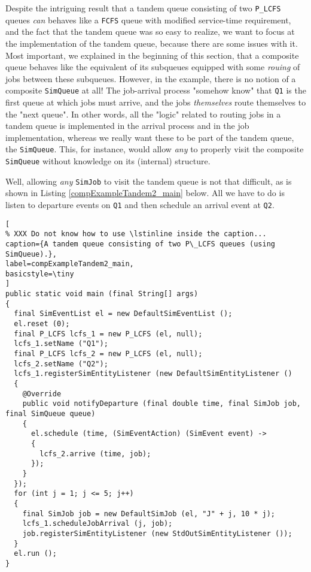 Despite the intriguing result that a tandem queue consisting of two
  \lstinline|P_LCFS| queues {\em can\/} behaves like a \lstinline|FCFS|
  queue with modified service-time requirement,
  and the fact that the tandem queue was so easy to realize,
  we want to focus at the implementation of the tandem queue,
  because there are some issues with it.
Most important,
  we explained in the beginning of this section,
  that a composite queue behaves like the equivalent
  of its subqueues equipped with some
  {\em rouing\/} of jobs between these subqueues.
However, in the example, there is no notion of a composite
  \lstinline|SimQueue| at all!
The job-arrival process "somehow know" that \lstinline|Q1|
  is the first queue at which jobs must arrive,
  and the jobs {\em themselves\/} route themselves
  to the "next queue".
In other words, all the "logic" related to routing jobs in a
  tandem queue is implemented in the arrival process and
  in the job implementation,
  whereas we really want these to be part of the tandem queue,
  the \lstinline|SimQueue|.
This, for instance, would allow {\em any\/} to properly visit the
  composite \lstinline{SimQueue} without knowledge on its
  (internal) structure.

Well, allowing {\em any\/} \lstinline|SimJob| to visit
  the tandem queue is not that difficult,
  as is shown in Listing \ref{compExampleTandem2_main} below.
All we have to do is listen to departure events
  on \lstinline|Q1| and then schedule an arrival event at \lstinline|Q2|.

\begin{lstlisting}[
% XXX Do not know how to use \lstinline inside the caption...
caption={A tandem queue consisting of two P\_LCFS queues (using SimQueue).},
label=compExampleTandem2_main,
basicstyle=\tiny
]
public static void main (final String[] args)
{    
  final SimEventList el = new DefaultSimEventList ();
  el.reset (0);
  final P_LCFS lcfs_1 = new P_LCFS (el, null);
  lcfs_1.setName ("Q1");
  final P_LCFS lcfs_2 = new P_LCFS (el, null);
  lcfs_2.setName ("Q2");
  lcfs_1.registerSimEntityListener (new DefaultSimEntityListener ()
  {
    @Override
    public void notifyDeparture (final double time, final SimJob job, final SimQueue queue)
    {
      el.schedule (time, (SimEventAction) (SimEvent event) ->
      {
        lcfs_2.arrive (time, job);
      });
    }
  });
  for (int j = 1; j <= 5; j++)
  {
    final SimJob job = new DefaultSimJob (el, "J" + j, 10 * j);
    lcfs_1.scheduleJobArrival (j, job);
    job.registerSimEntityListener (new StdOutSimEntityListener ());
  }
  el.run ();
}
\end{lstlisting}

